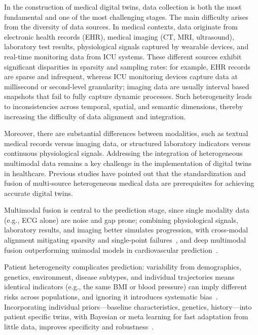 \documentclass[journal]{IEEEtran}
\begin{document}
In the construction of medical digital twins, data collection is both the most fundamental and one of the most challenging stages. The main difficulty arises from the diversity of data sources. In medical contexts, data originate from electronic health records (EHR), medical imaging (CT, MRI, ultrasound), laboratory test results, physiological signals captured by wearable devices, and real-time monitoring data from ICU systems. These different sources exhibit significant disparities in sparsity and sampling rates: for example, EHR records are sparse and infrequent, whereas ICU monitoring devices capture data at millisecond or second-level granularity; imaging data are usually interval based snapshots that fail to fully capture dynamic processes. Such heterogeneity leads to inconsistencies across temporal, spatial, and semantic dimensions, thereby increasing the difficulty of data alignment and integration.

Moreover, there are substantial differences between modalities, such as textual medical records versus imaging data, or structured laboratory indicators versus continuous physiological signals. Addressing the integration of heterogeneous multimodal data remains a key challenge in the implementation of digital twins in healthcare. Previous studies have pointed out that the standardization and fusion of multi-source heterogeneous medical data are prerequisites for achieving accurate digital twins\cite{tao2019digital,reddy2015healthcare}.

Multimodal fusion is central to the prediction stage, since single modality data (e.g., ECG alone) are noise and gap prone; combining physiological signals, laboratory results, and imaging better simulates progression, with cross-modal alignment mitigating sparsity and single-point failures~\cite{baltrusaitis2019multimodal}, and deep multimodal fusion outperforming unimodal models in cardiovascular prediction~\cite{huang2020fusion}.



Patient heterogeneity complicates prediction: variability from demographics, genetics, environment, disease subtypes, and individual trajectories means identical indicators (e.g., the same BMI or blood pressure) can imply different risks across populations, and ignoring it introduces systematic bias~\cite{obermeyer2016predicting,rajkomar2019machine,yu2018artificial}. Incorporating individual priors---baseline characteristics, genetics, history---into patient specific twins, with Bayesian or meta learning for fast adaptation from little data, improves specificity and robustness~\cite{bjornsson2020digitaltwins}.
\end{document}
